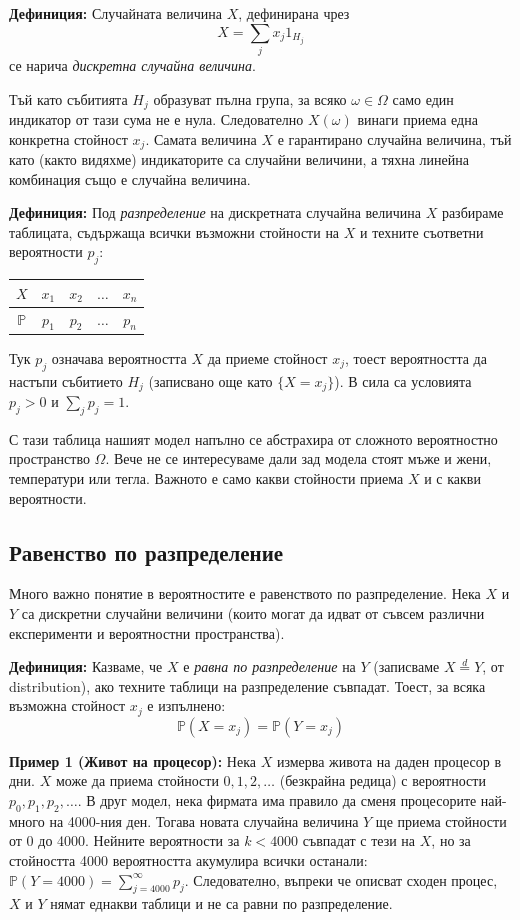 \documentclass{article}
\begin{document}
\textbf{Дефиниция:} Случайната величина $X$, дефинирана чрез
\[ X = \sum_{j} x_j 1_{H_j} \]
се нарича \textit{дискретна случайна величина}.

Тъй като събитията $H_j$ образуват пълна група, за всяко $\omega \in \Omega$ само един индикатор от тази сума не е нула. Следователно $X(\omega)$ винаги приема една конкретна стойност $x_j$. Самата величина $X$ е гарантирано случайна величина, тъй като (както видяхме) индикаторите са случайни величини, а тяхна линейна комбинация също е случайна величина. 

\textbf{Дефиниция:} Под \textit{разпределение} на дискретната случайна величина $X$ разбираме таблицата, съдържаща всички възможни стойности на $X$ и техните съответни вероятности $p_j$:
\begin{center}
\begin{tabular}{|c|c|c|c|c|}
\hline
$X$ & $x_1$ & $x_2$ & $\dots$ & $x_n$ \\
\hline
$\mathbb{P}$ & $p_1$ & $p_2$ & $\dots$ & $p_n$ \\
\hline
\end{tabular}
\end{center}
Тук $p_j$ означава вероятността $X$ да приеме стойност $x_j$, тоест вероятността да настъпи събитието $H_j$ (записвано още като $\{X = x_j\}$). В сила са условията $p_j > 0$ и $\sum_j p_j = 1$. 

С тази таблица нашият модел напълно се абстрахира от сложното вероятностно пространство $\Omega$. Вече не се интересуваме дали зад модела стоят мъже и жени, температури или тегла. Важното е само какви стойности приема $X$ и с какви вероятности.

\subsection{Равенство по разпределение}
Много важно понятие в вероятностите е равенството по разпределение. Нека $X$ и $Y$ са дискретни случайни величини (които могат да идват от съвсем различни експерименти и вероятностни пространства).

\textbf{Дефиниция:} Казваме, че $X$ е \textit{равна по разпределение} на $Y$ (записваме $X \stackrel{d}{=} Y$, от distribution), ако техните таблици на разпределение съвпадат. Тоест, за всяка възможна стойност $x_j$ е изпълнено:
\[ \mathbb{P}(X = x_j) = \mathbb{P}(Y = x_j) \]

\textbf{Пример 1 (Живот на процесор):} Нека $X$ измерва живота на даден процесор в дни. $X$ може да приема стойности $0, 1, 2, \dots$ (безкрайна редица) с вероятности $p_0, p_1, p_2, \dots$. 
В друг модел, нека фирмата има правило да сменя процесорите най-много на 4000-ния ден. Тогава новата случайна величина $Y$ ще приема стойности от 0 до 4000. Нейните вероятности за $k < 4000$ съвпадат с тези на $X$, но за стойността 4000 вероятността акумулира всички останали: $\mathbb{P}(Y=4000) = \sum_{j=4000}^{\infty} p_j$. Следователно, въпреки че описват сходен процес, $X$ и $Y$ нямат еднакви таблици и не са равни по разпределение.
\end{document}

